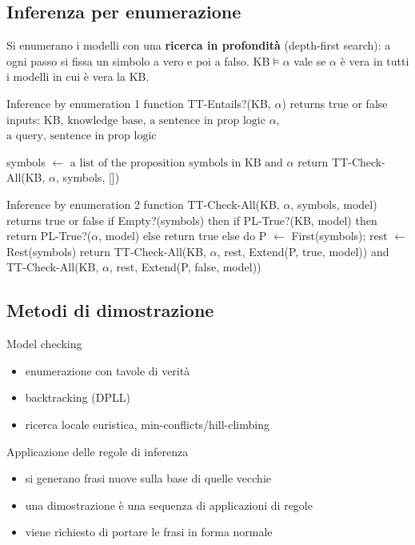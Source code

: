 \documentclass[11pt, a4paper]{article}
\newcommand{\KB}{\mathrm{KB}}
\begin{document}
\clearpage
\subsection{Inferenza per enumerazione}

Si enumerano i modelli con una \textbf{ricerca in profondità} (depth-first search): a ogni passo si fissa un simbolo a vero e poi a falso. $\KB \models \alpha$ vale se $\alpha$ è vera in tutti i modelli in cui è vera la KB.

\begin{codice}{Inference by enumeration 1}
function TT-Entails?(KB, $\alpha$) returns true or false
  inputs: KB, $\text{knowledge base, a sentence in prop logic}$
          $\alpha$, $\text{a query, sentence in prop logic}$

  symbols $\leftarrow$ $\text{a list of the proposition symbols in KB and }\alpha$
  return TT-Check-All(KB, $\alpha$, symbols, [])
\end{codice}

\begin{codice}{Inference by enumeration 2}
function TT-Check-All(KB, $\alpha$, symbols, model) returns true or false
  if Empty?(symbols) then
    if PL-True?(KB, model) then return PL-True?($\alpha$, model)
    else return true
  else do
    P $\leftarrow$ First(symbols); rest $\leftarrow$ Rest(symbols)
    return TT-Check-All(KB, $\alpha$, rest, Extend(P, true, model))
       and TT-Check-All(KB, $\alpha$, rest, Extend(P, false, model))
\end{codice}

\subsection{Metodi di dimostrazione}

\begin{tcbraster}[raster columns=2, raster equal height, raster column skip=10pt, raster before skip=8pt, raster after skip=10pt]
  \begin{defbox}{Model checking}
    \raggedright
    \begin{itemize}
      \item enumerazione con tavole di verità
      \item backtracking (DPLL)
      \item ricerca locale euristica, min-conflicts/hill-climbing
    \end{itemize}
  \end{defbox}
  \begin{defbox}{Applicazione delle regole di inferenza}
    \raggedright
    \begin{itemize}
      \item si generano frasi nuove sulla base di quelle vecchie
      \item una dimostrazione è una sequenza di applicazioni di regole
      \item viene richiesto di portare le frasi in forma normale
    \end{itemize}
  \end{defbox}
\end{tcbraster}
\end{document}
